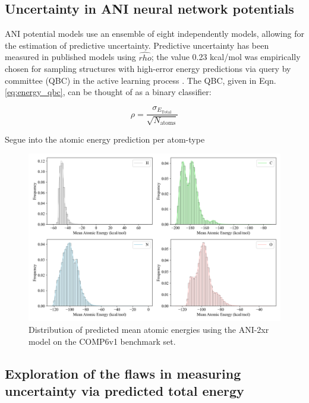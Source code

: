 \subsection{Uncertainty in ANI neural network potentials}
\label{subsec:ANI_uncertainty}

ANI potential models use an ensemble of eight independently models, allowing for the estimation of predictive uncertainty.
Predictive uncertainty has been measured in published models using $\hat{rho}$; the value 0.23 kcal/mol was empirically chosen for sampling structures with high-error energy predictions via query by committee (QBC) in the active learning process \cite{ani-1x}.
The QBC, given in Eqn. \ref{eq:energy_qbc}, can be thought of as a binary classifier: 

\begin{equation}
\rho = \frac{\sigma_{E_{\text{Total}}}}{\sqrt{N_{\text{atoms}}}}
\label{eq:energy_qbc}
\end{equation}

Segue into the atomic energy prediction per atom-type 

\begin{figure}[H]
    \centering
    \includegraphics[width=1\linewidth]{Images/2xr_outputs/2xr_comp6v1_mean-ae-per-atomtype.png}
    \caption[Mean atomic energy prediction per-atom with ANI-2xr]{Distribution of predicted mean atomic energies using the ANI-2xr model on the COMP6v1 benchmark set.}
    \label{fig:2xr_comp6v1_mean-ae-per-atomtype}
\end{figure}

\subsection{Exploration of the flaws in measuring uncertainty via predicted total energy}
\label{subsec:flaws_in_qbc}

